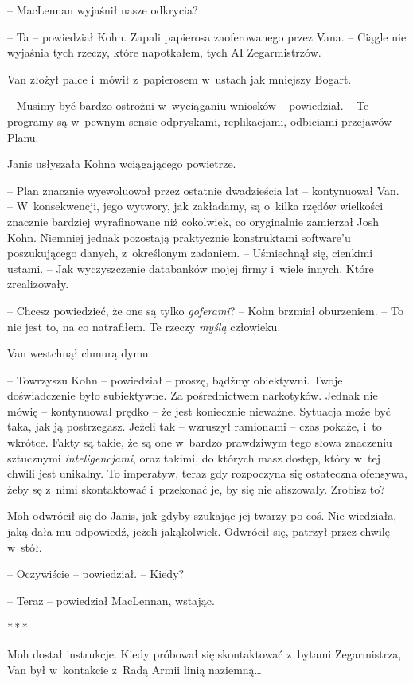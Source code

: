 \documentclass[oneside,polish,11pt,sfheadings]{mwbk}
\newcommand{\threeast}{\bigskip\par\centerline{*\,*\,*}\medskip\par}%
\begin{document}
-- MacLennan wyjaśnił nasze odkrycia?

-- Ta -- powiedział Kohn. Zapali papierosa zaoferowanego przez Vana. -- Ciągle nie wyjaśnia tych rzeczy, które napotkałem, tych AI
Zegarmistrzów.

Van złożył palce i~mówił z~papierosem w~ustach jak mniejszy Bogart. 

-- Musimy być bardzo ostrożni w~wyciąganiu wniosków -- powiedział. -- Te
programy są w~pewnym sensie odpryskami, replikacjami, odbiciami
przejawów Planu.

Janis usłyszała Kohna wciągającego powietrze.

-- Plan znacznie wyewoluował przez ostatnie dwadzieścia lat -- kontynuował
Van. -- W~konsekwencji, jego wytwory, jak zakładamy, są o~kilka rzędów
wielkości znacznie bardziej wyrafinowane niż cokolwiek, co oryginalnie
zamierzał Josh Kohn. Niemniej jednak pozostają praktycznie konstruktami
software'u poszukującego danych, z~określonym zadaniem. -- Uśmiechnął
się, cienkimi ustami. -- Jak wyczyszczenie databanków mojej firmy i~wiele
innych. Które zrealizowały.

-- Chcesz powiedzieć, że one są tylko \emph{goferami}? -- Kohn brzmiał
oburzeniem. -- To nie jest to, na co natrafiłem. Te rzeczy \emph{myślą
}człowieku.

Van westchnął chmurą dymu. 

-- Towrzyszu Kohn -- powiedział -- proszę,
bądźmy obiektywni. Twoje doświadczenie było subiektywne. Za
pośrednictwem narkotyków. Jednak nie mówię -- kontynuował prędko -- że
jest koniecznie nieważne. Sytuacja może być taka, jak ją postrzegasz.
Jeżeli tak -- wzruszył ramionami -- czas pokaże, i~to wkrótce. Fakty są
takie, że są one w~bardzo prawdziwym tego słowa znaczeniu sztucznymi
\emph{inteligencjami}, oraz takimi, do których masz dostęp, który w~tej
chwili jest unikalny. To imperatyw, teraz gdy rozpoczyna się ostateczna
ofensywa, żeby sę z~nimi skontaktować i~przekonać je, by się nie
afiszowały. Zrobisz to?

Moh odwrócił się do Janis, jak gdyby szukając jej twarzy po coś. Nie
wiedziała, jaką dała mu odpowiedź, jeżeli jakąkolwiek. Odwrócił się,
patrzył przez chwilę w~stół.

-- Oczywiście -- powiedział. -- Kiedy?

-- Teraz -- powiedział MacLennan, wstając.
  \threeast 

Moh dostał instrukcje. Kiedy próbował się skontaktować z~bytami
Zegarmistrza, Van był w~kontakcie z~Radą Armii linią naziemną\ldots
\end{document}
